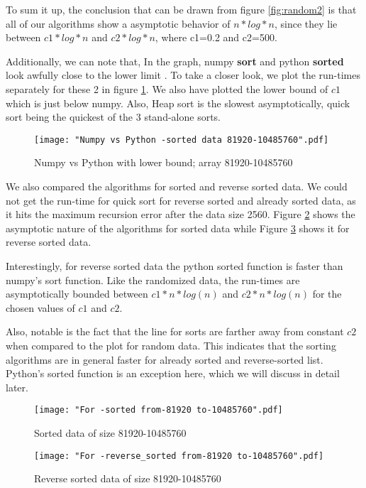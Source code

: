 \documentclass[sigconf, nonacm, natbib, screen, balance=False]{acmart}
\begin{document}
To sum it up, the conclusion that can be drawn from figure \ref{fig:random2} is that all of our algorithms show a asymptotic behavior of $n*log*n$, since they lie between $c1*log*n$ and $c2*log*n$, where c1=0.2 and c2=500. 

Additionally, we can note that, In the graph, numpy \textbf{sort} and python \textbf{sorted} look awfully close to the lower limit . To take a closer look, we plot the run-times separately for these 2 in  figure \ref{fig:numpyvspython}. We also have plotted the lower bound of $c1$ which is just below numpy. Also, Heap sort is the slowest asymptotically, quick sort being the quickest of the 3 stand-alone sorts.

\begin{figure}[ht]
\texttt{[image: "Numpy vs Python -sorted data 81920-10485760".pdf]}
    \caption{Numpy vs Python with lower bound; array 81920-10485760 }
    \label{fig:numpyvspython}
\end{figure}

We also compared the algorithms for sorted and reverse sorted data. We could not get the run-time for quick sort for reverse sorted and already sorted data, as it hits the maximum recursion error after the data size 2560. Figure \ref{fig:sorted1} shows the asymptotic nature of the algorithms for sorted data while Figure \ref{fig:rsorted1} shows it for reverse sorted data. 

Interestingly, for reverse sorted data the python sorted function is faster than numpy's sort function. Like the randomized data, the run-times are asymptotically bounded between $c1*n*log(n)$  and $c2*n*log(n)$ for the chosen values of $c1$ and $c2$.

Also, notable is the fact that the line for sorts are farther away from constant $c2$ when compared to the plot for random data. This indicates that the sorting algorithms are in general faster for already sorted and reverse-sorted list. Python's sorted function is an exception here, which we will discuss in detail later.

\begin{figure}[ht]
\texttt{[image: "For -sorted from-81920 to-10485760".pdf]}
    \caption{Sorted data of size 81920-10485760 }
    \label{fig:sorted1}
\end{figure}

\begin{figure}[ht]
\texttt{[image: "For -reverse\_sorted from-81920 to-10485760".pdf]}
    \caption{Reverse sorted data of size 81920-10485760 }
    \label{fig:rsorted1}
\end{figure}
\end{document}
